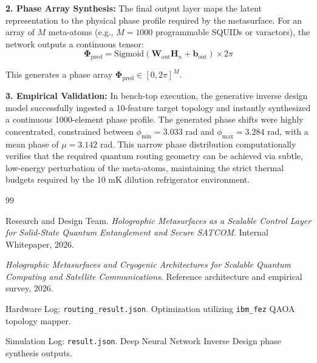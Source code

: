 \documentclass[11pt, a4paper]{article}
\begin{document}
\textbf{2. Phase Array Synthesis:}
The final output layer maps the latent representation to the physical phase profile required by the metasurface. For an array of $M$ meta-atoms (e.g., $M = 1000$ programmable SQUIDs or varactors), the network outputs a continuous tensor:
\begin{equation}
\boldsymbol{\Phi}_{\mathrm{pred}} = \mathrm{Sigmoid}(\mathbf{W}_{\mathrm{out}} \mathbf{H}_n + \mathbf{b}_{\mathrm{out}}) \times 2\pi
\end{equation}

This generates a phase array $\boldsymbol{\Phi}_{\mathrm{pred}} \in [0, 2\pi]^M$.

\textbf{3. Empirical Validation:}
In bench-top execution, the generative inverse design model successfully ingested a 10-feature target topology and instantly synthesized a continuous 1000-element phase profile. The generated phase shifts were highly concentrated, constrained between $\phi_{\min} = 3.033$ rad and $\phi_{\max} = 3.284$ rad, with a mean phase of $\mu = 3.142$ rad. This narrow phase distribution computationally verifies that the required quantum routing geometry can be achieved via subtle, low-energy perturbation of the meta-atoms, maintaining the strict thermal budgets required by the 10 mK dilution refrigerator environment.

\vspace{1cm}
\begin{thebibliography}{99}

Research and Design Team. \textit{Holographic Metasurfaces as a Scalable Control Layer for Solid-State Quantum Entanglement and Secure SATCOM}. Internal Whitepaper, 2026.

\textit{Holographic Metasurfaces and Cryogenic Architectures for Scalable Quantum Computing and Satellite Communications}. Reference architecture and empirical survey, 2026.

Hardware Log: \texttt{routing\_result.json}. Optimization utilizing \texttt{ibm\_fez} QAOA topology mapper.

Simulation Log: \texttt{result.json}. Deep Neural Network Inverse Design phase synthesis outputs.

\end{thebibliography}
\end{document}
